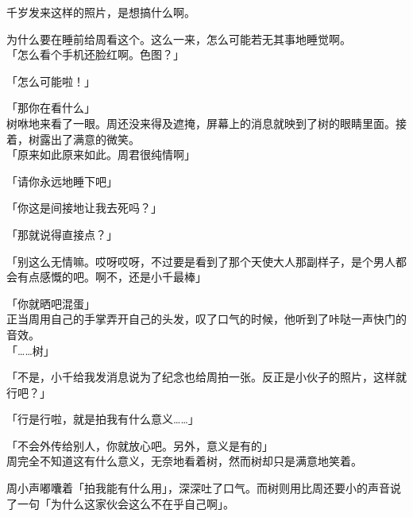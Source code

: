 千岁发来这样的照片，是想搞什么啊。

为什么要在睡前给周看这个。这么一来，怎么可能若无其事地睡觉啊。\\

「怎么看个手机还脸红啊。色图？」

「怎么可能啦！」

「那你在看什么」\\

树咻地来看了一眼。周还没来得及遮掩，屏幕上的消息就映到了树的眼睛里面。接着，树露出了满意的微笑。\\

「原来如此原来如此。周君很纯情啊」

「请你永远地睡下吧」

「你这是间接地让我去死吗？」

「那就说得直接点？」

「别这么无情嘛。哎呀哎呀，不过要是看到了那个天使大人那副样子，是个男人都会有点感慨的吧。啊不，还是小千最棒」

「你就晒吧混蛋」\\

正当周用自己的手掌弄开自己的头发，叹了口气的时候，他听到了咔哒一声快门的音效。\\

「……树」

「不是，小千给我发消息说为了纪念也给周拍一张。反正是小伙子的照片，这样就行吧？」

「行是行啦，就是拍我有什么意义……」

「不会外传给别人，你就放心吧。另外，意义是有的」\\

周完全不知道这有什么意义，无奈地看着树，然而树却只是满意地笑着。

周小声嘟囔着「拍我能有什么用」，深深吐了口气。而树则用比周还要小的声音说了一句「为什么这家伙会这么不在乎自己啊」。
